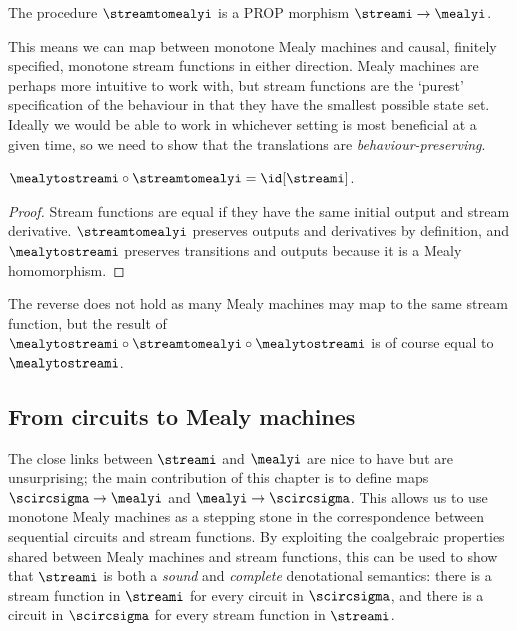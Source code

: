 \documentclass{lmcs}
\begin{document}
\begin{cor}
    The procedure \(\streamtomealyi\) is a PROP morphism
    \(\streami \to \mealyi\).
\end{cor}

This means we can map between monotone Mealy machines and causal, finitely
specified, monotone stream functions in either direction.
Mealy machines are perhaps more intuitive to work with, but stream functions
are the `purest' specification of the behaviour in that they have the smallest
possible state set.
Ideally we would be able to work in whichever setting is most beneficial at a
given time, so we need to show that the translations are
\emph{behaviour-preserving}.

\begin{prop}\label{prop:mealy-stream-id}
    \(\mealytostreami \circ \streamtomealyi = \id[\streami]\).
\end{prop}
\begin{proof}
    Stream functions are equal if they have the same initial output and
    stream derivative.
    \(\streamtomealyi\) preserves outputs and derivatives by definition, and
    \(\mealytostreami\) preserves transitions and outputs because it is a Mealy
    homomorphism.
\end{proof}

The reverse does not hold as many Mealy machines may map to the same stream
function, but the result of
\(\mealytostreami \circ \streamtomealyi \circ \mealytostreami\) is of course
equal to \(\mealytostreami\).

\subsection{From circuits to Mealy machines}\label{sec:synthesis}

The close links between \(\streami\) and \(\mealyi\) are nice to have but are
unsurprising; the main contribution of this chapter is to define maps
\(\scircsigma \to \mealyi\) and \(\mealyi \to \scircsigma\).
This allows us to use monotone Mealy machines as a stepping stone in the
correspondence between sequential circuits and stream functions.
By exploiting the coalgebraic properties shared between Mealy machines and
stream functions, this can be used to show that \(\streami\) is both a
\emph{sound} and \emph{complete} denotational semantics: there is a stream
function in \(\streami\) for every circuit in \(\scircsigma\), and there is a
circuit in \(\scircsigma\) for every stream function in \(\streami\).
\end{document}

